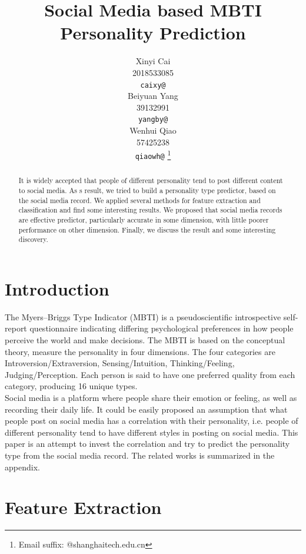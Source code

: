 \documentclass{article}
\title{Social Media based MBTI Personality Prediction}
\author{%
  Xinyi Cai\\
  2018533085\\
  \texttt{caixy@} \\
  \And
  Beiyuan Yang \\
  39132991 \\
  \texttt{yangby@} \\
  \And
  Wenhui Qiao \\
  57425238 \\
  \texttt{qiaowh@} \thanks{Email suffix: @shanghaitech.edu.cn} \\
}
\begin{document}
\maketitle

\begin{abstract}
It is widely accepted that people of different personality tend to post different content to social media. As s result, we tried to build a personality type predictor, based on the social media record. We applied several methods for feature extraction and classification and find some interesting results. We proposed that social media records are effective predictor, particularly accurate in some dimension, with little poorer performance on other dimension. Finally, we discuss the result and some interesting discovery.
\end{abstract}

\section{Introduction}
The Myers–Briggs Type Indicator (MBTI) is a pseudoscientific introspective self-report questionnaire indicating differing psychological preferences in how people perceive the world and make decisions. The MBTI is based on the conceptual theory, measure the personality in four dimensions. The four categories are Introversion/Extraversion, Sensing/Intuition, Thinking/Feeling, Judging/Perception. Each person is said to have one preferred quality from each category, producing 16 unique types. \\
Social media is a platform where people share their emotion or feeling, as well as recording their daily life. It could be easily proposed an assumption that what people post on social media has a correlation with their personality, i.e. people of different personality tend to have different styles in posting on social media. This paper is an attempt to invest the correlation and try to predict the personality type from the social media record. The related works is summarized in the appendix.


\section{Feature Extraction}
\end{document}
